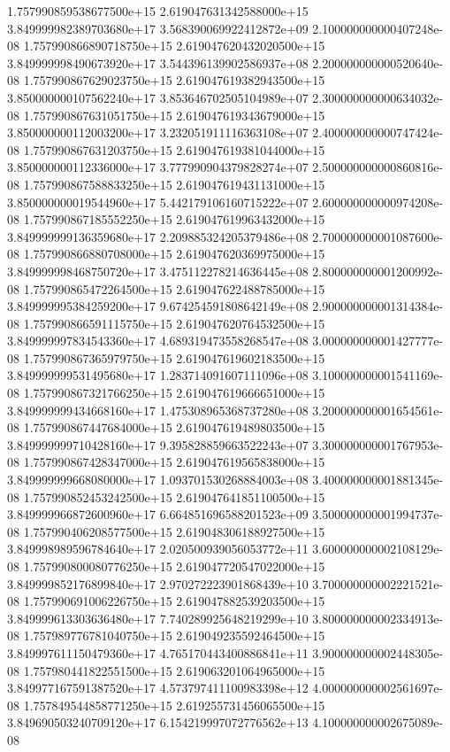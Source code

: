 \documentclass{article}
\begin{document}
{1.757990859538677500e+15 2.619047631342588000e+15 3.849999982389703680e+17 3.568390069922412872e+09 2.100000000000407248e-08
1.757990866890718750e+15 2.619047620432020500e+15 3.849999998490673920e+17 3.544396139902586937e+08 2.200000000000520640e-08
1.757990867629023750e+15 2.619047619382943500e+15 3.850000000107562240e+17 3.853646702505104989e+07 2.300000000000634032e-08
1.757990867631051750e+15 2.619047619343679000e+15 3.850000000112003200e+17 3.232051911116363108e+07 2.400000000000747424e-08
1.757990867631203750e+15 2.619047619381044000e+15 3.850000000112336000e+17 3.777990904379828274e+07 2.500000000000860816e-08
1.757990867588833250e+15 2.619047619431131000e+15 3.850000000019544960e+17 5.442179106160715222e+07 2.600000000000974208e-08
1.757990867185552250e+15 2.619047619963432000e+15 3.849999999136359680e+17 2.209885324205379486e+08 2.700000000001087600e-08
1.757990866880708000e+15 2.619047620369975000e+15 3.849999998468750720e+17 3.475112278214636445e+08 2.800000000001200992e-08
1.757990865472264500e+15 2.619047622488785000e+15 3.849999995384259200e+17 9.674254591808642149e+08 2.900000000001314384e-08
1.757990866591115750e+15 2.619047620764532500e+15 3.849999997834543360e+17 4.689319473558268547e+08 3.000000000001427777e-08
1.757990867365979750e+15 2.619047619602183500e+15 3.849999999531495680e+17 1.283714091607111096e+08 3.100000000001541169e-08
1.757990867321766250e+15 2.619047619666651000e+15 3.849999999434668160e+17 1.475308965368737280e+08 3.200000000001654561e-08
1.757990867447684000e+15 2.619047619489803500e+15 3.849999999710428160e+17 9.395828859663522243e+07 3.300000000001767953e-08
1.757990867428347000e+15 2.619047619565838000e+15 3.849999999668080000e+17 1.093701530268884003e+08 3.400000000001881345e-08
1.757990852453242500e+15 2.619047641851100500e+15 3.849999966872600960e+17 6.664851696588201523e+09 3.500000000001994737e-08
1.757990406208577500e+15 2.619048306188927500e+15 3.849998989596784640e+17 2.020500939056053772e+11 3.600000000002108129e-08
1.757990800080776250e+15 2.619047720547022000e+15 3.849999852176899840e+17 2.970272223901868439e+10 3.700000000002221521e-08
1.757990691006226750e+15 2.619047882539203500e+15 3.849999613303636480e+17 7.740289925648219299e+10 3.800000000002334913e-08
1.757989776781040750e+15 2.619049235592464500e+15 3.849997611150479360e+17 4.765170443400886841e+11 3.900000000002448305e-08
1.757980441822551500e+15 2.619063201064965000e+15 3.849977167591387520e+17 4.573797411100983398e+12 4.000000000002561697e-08
1.757849544858771250e+15 2.619255731456065500e+15 3.849690503240709120e+17 6.154219997072776562e+13 4.100000000002675089e-08
}
\end{document}
